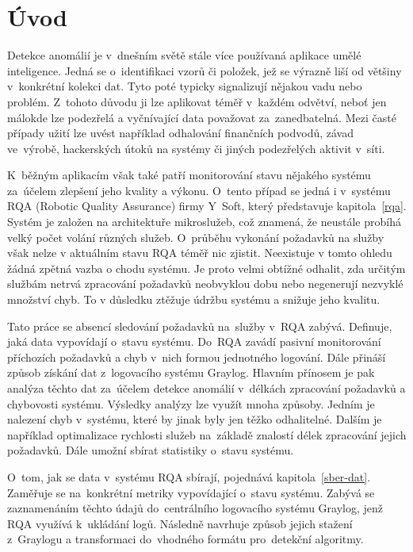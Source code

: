 \chapter{Úvod}
\label{uvod}

Detekce anomálií je v~dnešním světě stále více používaná aplikace umělé inteligence. Jedná se o~identifikaci vzorů či položek, jež se výrazně liší od většiny v~konkrétní kolekci dat. Tyto poté typicky signalizují nějakou vadu nebo problém. Z~tohoto důvodu ji lze aplikovat téměř v~každém odvětví, neboť jen málokde lze podezřelá a vyčnívající data považovat za~zanedbatelná. Mezi časté případy užití lze uvést například odhalování finančních podvodů, závad ve~výrobě, hackerských útoků na systémy či jiných podezřelých aktivit v~síti.

K~běžným aplikacím však také patří monitorování stavu nějakého systému za~účelem zlepšení jeho kvality a výkonu. O~tento případ se jedná i v~systému RQA (Robotic Quality Assurance) firmy Y~Soft, který představuje kapitola~\ref{rqa}. Systém je založen na architektuře mikroslužeb, což znamená, že neustále probíhá velký počet volání různých služeb. O~průběhu vykonání požadavků na služby však nelze v aktuálním stavu RQA téměř nic zjistit. Neexistuje v tomto ohledu žádná zpětná vazba o chodu systému. Je proto velmi obtížné odhalit, zda určitým službám netrvá zpracování požadavků neobvyklou dobu nebo negenerují nezvyklé množství chyb. To v důsledku ztěžuje údržbu systému a snižuje jeho kvalitu.

Tato práce se absencí sledování požadavků na~služby v~RQA zabývá. Definuje, jaká data vypovídají o~stavu systému. Do~RQA zavádí pasivní monitorování příchozích požadavků a chyb v~nich formou jednotného logování. Dále přináší způsob získání dat z~logovacího systému Graylog. Hlavním přínosem je pak analýza těchto dat za~účelem detekce anomálií v~délkách zpracování požadavků a chybovosti systému. Výsledky analýzy lze využít mnoha způsoby. Jedním je nalezení chyb v~systému, které by jinak byly jen těžko odhalitelné. Dalším je například optimalizace rychlosti služeb na~základě znalostí délek zpracování jejich požadavků. Dále umožní sbírat statistiky o~stavu systému.

O~tom, jak se data v~systému RQA sbírají, pojednává kapitola~\ref{sber-dat}. Zaměřuje se na~konkrétní metriky vypovídající o~stavu systému. Zabývá se zaznamenáním těchto údajů do~centrálního logovacího systému Graylog, jenž RQA využívá k~ukládání logů. Následně navrhuje způsob jejich stažení z~Graylogu a transformaci do~vhodného formátu pro~detekční algoritmy.

